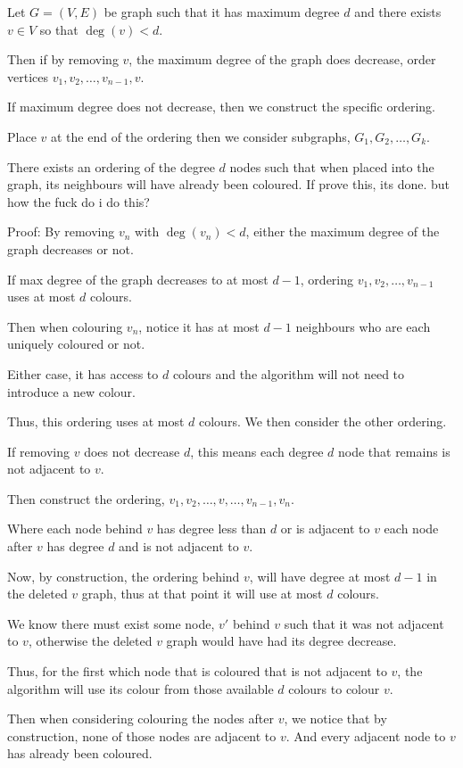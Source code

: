 \begin{soln}
	Let \(G = (V, E)\) be graph such that it has maximum degree \(d\) and there exists \(v \in V\) so that \(\deg(v) < d\).

	Then if by removing \(v\), the maximum degree of the graph does decrease, order vertices \(v_1, v_2, \dots, v_{n-1}, v\).

	If maximum degree does not decrease, then we construct the specific ordering.

	Place \(v\) at the end of the ordering then we consider subgraphs, \(G_1, G_2, \dots, G_k\).

	There exists an ordering of the degree \(d\) nodes such that when placed into the graph, its neighbours will have already been coloured.
	If prove this, its done. but how the fuck do i do this?

	Proof: By removing \(v_n\) with \(\deg(v_n) < d\), either the maximum degree of the graph decreases or not.

	If max degree of the graph decreases to at most \(d - 1\), ordering \(v_1, v_2, \dots, v_{n-1}\) uses at most \(d\) colours.

	Then when colouring \(v_n\), notice it has at most \(d - 1\) neighbours who are each uniquely coloured or not.

	Either case, it has access to \(d\) colours and the algorithm will not need to introduce a new colour.

	Thus, this ordering uses at most \(d\) colours. We then consider the other ordering.

	If removing \(v\) does not decrease \(d\), this means each degree \(d\) node that remains is not adjacent to \(v\).

	Then construct the ordering, \(v_1, v_2, \dots, v, \dots, v_{n-1}, v_n\).

	Where each node behind \(v\) has degree less than \(d\) or is adjacent to \(v\) each node after \(v\) has degree \(d\) and is not adjacent to \(v\).

	Now, by construction, the ordering behind \(v\), will have degree at most \(d - 1\) in the deleted \(v\) graph, thus at that point it will use at most \(d\) colours.

	We know there must exist some node, \(v'\) behind \(v\) such that it was not adjacent to \(v\), otherwise the deleted \(v\) graph would have had its degree decrease.

	Thus, for the first which node that is coloured that is not adjacent to \(v\), the algorithm will use its colour from those available \(d\) colours to colour \(v\).

	Then when considering colouring the nodes after \(v\), we notice that by construction, none of those nodes are adjacent to \(v\).
	And every adjacent node to \(v\) has already been coloured.


\end{soln}
